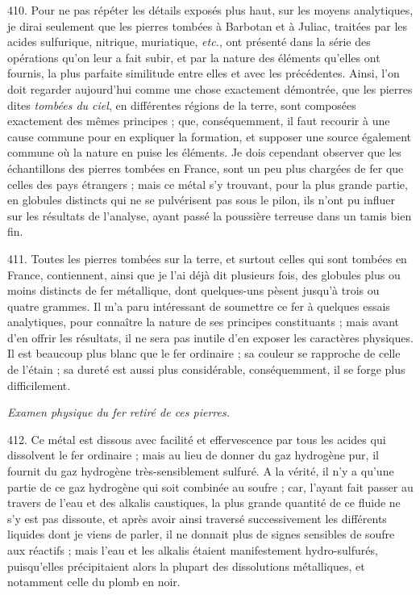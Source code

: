 \documentclass[a4paper, 11pt, oneside, polutonikogreek, french]{article}
\begin{document}
410. Pour ne pas répéter les détails exposés plus haut, sur les moyens analytiques, je dirai seulement que les pierres tombées à Barbotan et à Juliac, traitées par les acides sulfurique, nitrique, muriatique, \emph{etc.}, ont présenté dans la série des opérations qu'on leur a fait subir, et par la nature des éléments qu'elles ont fournis, la plus parfaite similitude entre elles et avec les précédentes. Ainsi, l'on doit regarder aujourd'hui comme une chose exactement démontrée, que les pierres dites \emph{tombées du ciel}, en différentes régions de la terre, sont composées exactement des mêmes principes ; que, conséquemment, il faut recourir à une cause commune pour en expliquer la formation, et supposer une source également commune où la nature en puise les éléments. Je dois cependant observer que les échantillons des pierres tombées en France, sont un peu plus chargées de fer que celles des pays étrangers ; mais ce métal s'y trouvant, pour la plus grande partie, en globules distincts qui ne se pulvérisent pas sous le pilon, ils n'ont pu influer sur les résultats de l'analyse, ayant passé la poussière terreuse dans un tamis bien fin.

411. Toutes les pierres tombées sur la terre, et surtout celles qui sont tombées en France, contiennent, ainsi que je l'ai déjà dit plusieurs fois, des globules plus ou moins distincts de fer métallique, dont quelques-uns pèsent jusqu'à trois ou quatre grammes. Il m'a paru intéressant de soumettre ce fer à quelques essais analytiques, pour connaître la nature de ses principes constituants ; mais avant d'en offrir les résultats, il ne sera pas inutile d'en exposer les caractères physiques. Il est beaucoup plus blanc que le fer ordinaire ; sa couleur se rapproche de celle de l'étain ; sa dureté est aussi plus considérable, conséquemment, il se forge plus difficilement.

\begin{center}
\emph{Examen physique du fer retiré de ces pierres.}
\end{center}

412. Ce métal est dissous avec facilité et effervescence par tous les acides qui dissolvent le fer ordinaire ; mais au lieu de donner du gaz hydrogène pur, il fournit du gaz hydrogène très-sensiblement sulfuré. A la vérité, il n'y a qu'une partie de ce gaz hydrogène qui soit combinée au soufre ; car, l'ayant fait passer au travers de l'eau et des alkalis caustiques, la plus grande quantité de ce fluide ne s'y est pas dissoute, et après avoir ainsi traversé successivement les différents liquides dont je viens de parler, il ne donnait plus de signes sensibles de soufre aux réactifs ; mais l'eau et les alkalis étaient manifestement hydro-sulfurés, puisqu'elles précipitaient alors la plupart des dissolutions métalliques, et notamment celle du plomb en noir.
\end{document}
